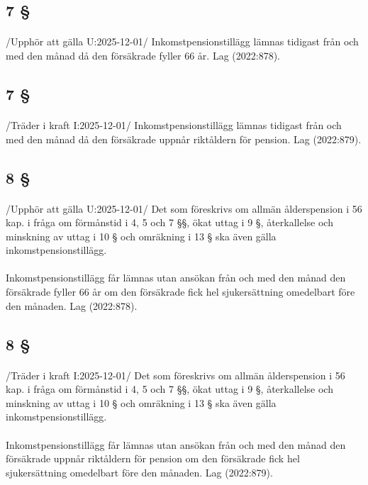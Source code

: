 \documentclass[a4paper,notitlepage,openany,10pt]{book}
\begin{document}
\subsection*{7 §}
\paragraph*{}
/Upphör att gälla U:2025-12-01/
Inkomstpensionstillägg lämnas tidigast från och med den månad då den försäkrade fyller 66 år.
Lag (2022:878).
\subsection*{7 §}
\paragraph*{}
/Träder i kraft I:2025-12-01/
Inkomstpensionstillägg lämnas tidigast från och med den månad då den försäkrade uppnår riktåldern för pension.
Lag (2022:879).
\subsection*{8 §}
\paragraph*{}
/Upphör att gälla U:2025-12-01/
Det som föreskrivs om allmän ålderspension i 56 kap. i fråga om förmånstid i 4, 5 och 7 §§, ökat uttag i 9 §, återkallelse och minskning av uttag i 10 § och omräkning i 13 § ska även gälla inkomstpensionstillägg.
\paragraph*{}
Inkomstpensionstillägg får lämnas utan ansökan från och med den månad den försäkrade fyller 66 år om den försäkrade fick hel sjukersättning omedelbart före den månaden.
Lag (2022:878).
\subsection*{8 §}
\paragraph*{}
/Träder i kraft I:2025-12-01/
Det som föreskrivs om allmän ålderspension i 56 kap. i fråga om förmånstid i 4, 5 och 7 §§, ökat uttag i 9 §, återkallelse och minskning av uttag i 10 § och omräkning i 13 § ska även gälla inkomstpensionstillägg.
\paragraph*{}
Inkomstpensionstillägg får lämnas utan ansökan från och med den månad den försäkrade uppnår riktåldern för pension om den försäkrade fick hel sjukersättning omedelbart före den månaden.
Lag (2022:879).
\end{document}
